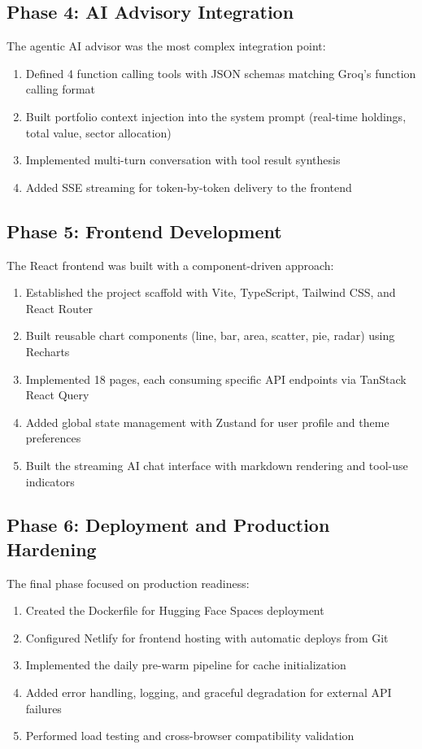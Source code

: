 \documentclass[12pt, a4paper, oneside]{report}
\begin{document}
\subsection{Phase 4: AI Advisory Integration}

The agentic AI advisor was the most complex integration point:
\begin{enumerate}[nosep]
    \item Defined 4 function calling tools with JSON schemas matching Groq's function calling format
    \item Built portfolio context injection into the system prompt (real-time holdings, total value, sector allocation)
    \item Implemented multi-turn conversation with tool result synthesis
    \item Added SSE streaming for token-by-token delivery to the frontend
\end{enumerate}

\subsection{Phase 5: Frontend Development}

The React frontend was built with a component-driven approach:
\begin{enumerate}[nosep]
    \item Established the project scaffold with Vite, TypeScript, Tailwind CSS, and React Router
    \item Built reusable chart components (line, bar, area, scatter, pie, radar) using Recharts
    \item Implemented 18 pages, each consuming specific API endpoints via TanStack React Query
    \item Added global state management with Zustand for user profile and theme preferences
    \item Built the streaming AI chat interface with markdown rendering and tool-use indicators
\end{enumerate}

\subsection{Phase 6: Deployment and Production Hardening}

The final phase focused on production readiness:
\begin{enumerate}[nosep]
    \item Created the Dockerfile for Hugging Face Spaces deployment
    \item Configured Netlify for frontend hosting with automatic deploys from Git
    \item Implemented the daily pre-warm pipeline for cache initialization
    \item Added error handling, logging, and graceful degradation for external API failures
    \item Performed load testing and cross-browser compatibility validation
\end{enumerate}
\end{document}
